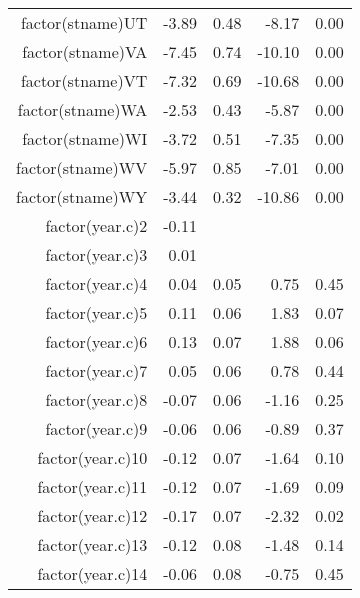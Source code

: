 \begin{table}[ht]
\begin{tabular}{rrrrr}
  factor(stname)UT & -3.89 & 0.48 & -8.17 & 0.00 \\ 
  factor(stname)VA & -7.45 & 0.74 & -10.10 & 0.00 \\ 
  factor(stname)VT & -7.32 & 0.69 & -10.68 & 0.00 \\ 
  factor(stname)WA & -2.53 & 0.43 & -5.87 & 0.00 \\ 
  factor(stname)WI & -3.72 & 0.51 & -7.35 & 0.00 \\ 
  factor(stname)WV & -5.97 & 0.85 & -7.01 & 0.00 \\ 
  factor(stname)WY & -3.44 & 0.32 & -10.86 & 0.00 \\ 
  factor(year.c)2 & -0.11 &  &  &  \\ 
  factor(year.c)3 & 0.01 &  &  &  \\ 
  factor(year.c)4 & 0.04 & 0.05 & 0.75 & 0.45 \\ 
  factor(year.c)5 & 0.11 & 0.06 & 1.83 & 0.07 \\ 
  factor(year.c)6 & 0.13 & 0.07 & 1.88 & 0.06 \\ 
  factor(year.c)7 & 0.05 & 0.06 & 0.78 & 0.44 \\ 
  factor(year.c)8 & -0.07 & 0.06 & -1.16 & 0.25 \\ 
  factor(year.c)9 & -0.06 & 0.06 & -0.89 & 0.37 \\ 
  factor(year.c)10 & -0.12 & 0.07 & -1.64 & 0.10 \\ 
  factor(year.c)11 & -0.12 & 0.07 & -1.69 & 0.09 \\ 
  factor(year.c)12 & -0.17 & 0.07 & -2.32 & 0.02 \\ 
  factor(year.c)13 & -0.12 & 0.08 & -1.48 & 0.14 \\ 
  factor(year.c)14 & -0.06 & 0.08 & -0.75 & 0.45 \\ 
   \hline
\end{tabular}
\end{table}
